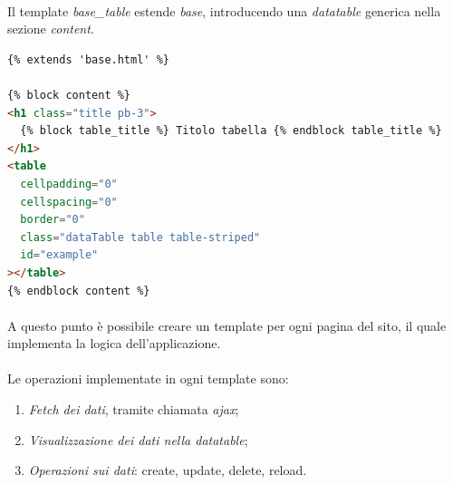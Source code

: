 \documentclass[12pt,a4paper,twoside,english,italian]{book}
\begin{document}
\newpage

\paragraph{} Il template \emph{base\_table} estende \emph{base}, introducendo una \emph{datatable} generica nella sezione \emph{content}. 

\begin{lstlisting}[language=html, caption=Template base\_table.html]
{% extends 'base.html' %} 

{% block content %}
<h1 class="title pb-3">
  {% block table_title %} Titolo tabella {% endblock table_title %}
</h1>
<table
  cellpadding="0"
  cellspacing="0"
  border="0"
  class="dataTable table table-striped"
  id="example"
></table>
{% endblock content %}

\end{lstlisting}

\paragraph{} A questo punto è possibile creare un template per ogni pagina del sito, il quale implementa la logica dell'applicazione. 

\paragraph{} Le operazioni implementate in ogni template sono:\begin{enumerate}
    \item \emph{Fetch dei dati}, tramite chiamata \emph{ajax};
    \item \emph{Visualizzazione dei dati nella datatable};
    \item \emph{Operazioni sui dati}: create, update, delete, reload.  
\end{enumerate}
\end{document}
